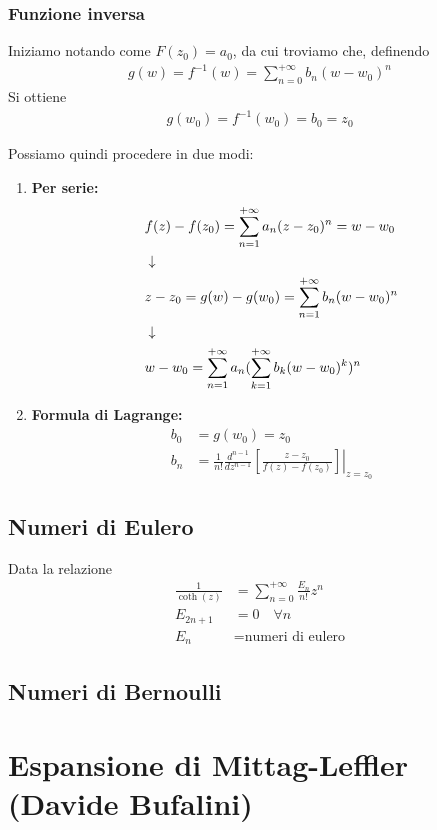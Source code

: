 \subsubsection{Funzione inversa}

Iniziamo notando come $F(z_0) = a_0$, da cui troviamo che, definendo
\begin{align}
	g(w) = f^{-1}(w) = \sum_{n=0}^{+\infty} b_n(w-w_0)^n
\end{align}
Si ottiene
\begin{align}
	g(w_0) = f^{-1}(w_0) = b_0 = z_0
\end{align}

Possiamo quindi procedere in due modi:
\begin{enumerate}
	\item \textbf{Per serie:}
	\begin{align}
		&f(z) - f(z_0) = \sum_{n=1}^{+\infty} a_n (z-z_0)^n= w-w_0\\ &\downarrow \nonumber \\
		& z -z_0 = g(w) - g(w_0) = 	 \sum_{n=1}^{+\infty} b_n(w-w_0)^n	\\ &\downarrow \nonumber \\
		& w - w_0 = \sum_{n=1}^{+\infty} a_n (\sum_{k=1}^{+\infty} b_k (w-w_0)^k)^n
	\end{align}
	\item \textbf{Formula di Lagrange:}
	\begin{align}
		b_0 &= g(w_0) = z_0\\
		b_n &= \frac{1}{n!} \frac{d^{n-1}}{dz^{n-1}} \left. \left[ \frac{z-z_0}{f(z) - f(z_0)} \right] \right|_{z=z_0}
	\end{align}
	
\end{enumerate}

\newpage


\subsection{Numeri di Eulero}

Data la relazione
\begin{align}
	\frac{1}{\coth (z)} &= \sum_{n=0}^{+\infty} \frac{E_n}{n!}z^n\\
	E_{2n+1} &= 0 \quad \forall n\\
	E_n &= \text{numeri di eulero}
\end{align}

\subsection{Numeri di Bernoulli}
\newpage

\section{Espansione di Mittag-Leffler (Davide Bufalini)}


